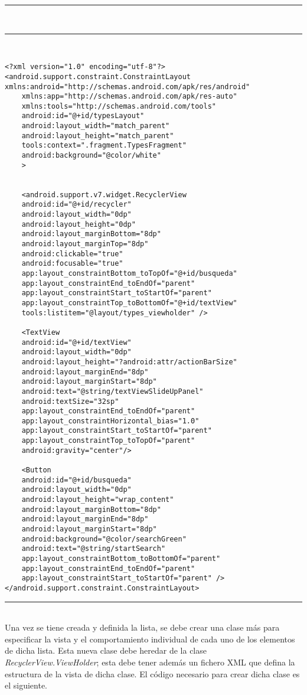 \noindent\rule[-1ex]{\textwidth}{1pt}\\
\newpage
\noindent\rule[-1ex]{\textwidth}{1pt}\\
\begin{lstlisting}[caption=Código XML de la vista de una lista de elementos.]
<?xml version="1.0" encoding="utf-8"?>
<android.support.constraint.ConstraintLayout xmlns:android="http://schemas.android.com/apk/res/android"
	xmlns:app="http://schemas.android.com/apk/res-auto"
	xmlns:tools="http://schemas.android.com/tools"
	android:id="@+id/typesLayout"
	android:layout_width="match_parent"
	android:layout_height="match_parent"
	tools:context=".fragment.TypesFragment"
	android:background="@color/white"
	>


	<android.support.v7.widget.RecyclerView
	android:id="@+id/recycler"
	android:layout_width="0dp"
	android:layout_height="0dp"
	android:layout_marginBottom="8dp"
	android:layout_marginTop="8dp"
	android:clickable="true"
	android:focusable="true"
	app:layout_constraintBottom_toTopOf="@+id/busqueda"
	app:layout_constraintEnd_toEndOf="parent"
	app:layout_constraintStart_toStartOf="parent"
	app:layout_constraintTop_toBottomOf="@+id/textView"
	tools:listitem="@layout/types_viewholder" />
	
	<TextView
	android:id="@+id/textView"
	android:layout_width="0dp"
	android:layout_height="?android:attr/actionBarSize"
	android:layout_marginEnd="8dp"
	android:layout_marginStart="8dp"
	android:text="@string/textViewSlideUpPanel"
	android:textSize="32sp"
	app:layout_constraintEnd_toEndOf="parent"
	app:layout_constraintHorizontal_bias="1.0"
	app:layout_constraintStart_toStartOf="parent"
	app:layout_constraintTop_toTopOf="parent"
	android:gravity="center"/>
	
	<Button
	android:id="@+id/busqueda"
	android:layout_width="0dp"
	android:layout_height="wrap_content"
	android:layout_marginBottom="8dp"
	android:layout_marginEnd="8dp"
	android:layout_marginStart="8dp"
	android:background="@color/searchGreen"
	android:text="@string/startSearch"
	app:layout_constraintBottom_toBottomOf="parent"
	app:layout_constraintEnd_toEndOf="parent"
	app:layout_constraintStart_toStartOf="parent" />
</android.support.constraint.ConstraintLayout>
\end{lstlisting}
\noindent\rule[-1ex]{\textwidth}{1pt}\\

Una vez se tiene  creada y definida la lista, se debe crear una clase más para especificar la vista y el comportamiento individual de cada uno de los elementos de dicha lista. Esta nueva clase debe heredar de la clase \textit{RecyclerView.ViewHolder}; esta debe tener además un fichero XML que defina la estructura de la vista de dicha clase. El código necesario para crear dicha clase es el siguiente.\newline

